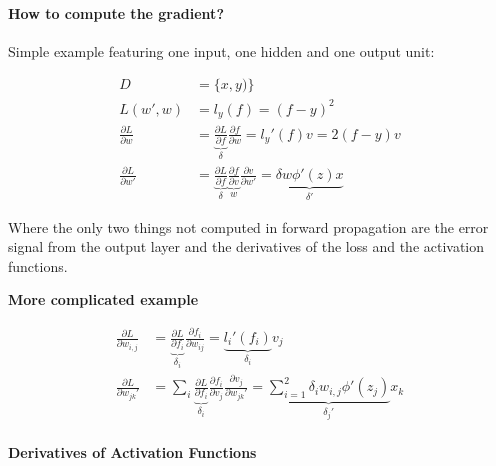 \documentclass[10pt,a4paper]{scrartcl}
\begin{document}
\begin{multicols*}{2}
\paragraph{How to compute the gradient?}

Simple example featuring one input, one hidden and one output unit:



\begin{align*}
D&=\{x,y)\}\\
L(w',w)&=l_y(f)=(f-y)^2\\
\frac{\partial L}{\partial w}&=\underbrace{\frac{\partial L}{\partial f}}_{\delta}\frac{\partial f}{\partial w}=l_y'(f)v=2(f-y)v\\
\frac{\partial L}{\partial w'}&=\underbrace{\frac{\partial L}{\partial f}}_{\delta}
\underbrace{\frac{\partial f}{\partial v}}_w
\frac{\partial v}{\partial w'}=\underbrace{\delta w\phi'(z)x}_{\delta'}
\end{align*}

Where the only two things not computed in forward propagation are the error signal from the output layer and the derivatives of the loss and the activation functions.

\textbf{More complicated example}


\begin{align*}
\frac{\partial L}{\partial w_{i,j}}&=\underbrace{\frac{\partial L}{\partial f_i}}_{\delta_i}\frac{\partial f_i}{\partial w_{ij}}=\underbrace{l_i'(f_i)}_{\delta_i}v_j\\
\frac{\partial L}{\partial w_{jk}'}&=\sum\limits_i\underbrace{\frac{\partial L}{\partial f_i}}_{\delta_i}\frac{\partial f_i}{\partial v_j}\frac{\partial v_j}{\partial w_{jk}'}=\underbrace{\sum\limits_{i=1}^2\delta_i w_{i,j}\phi'(z_j)}_{\delta_j'}x_k
\end{align*}

\paragraph{Derivatives of Activation Functions}



\end{multicols*}
\end{document}
